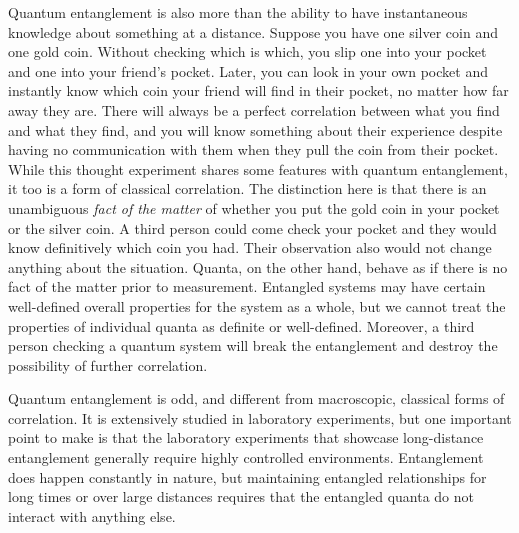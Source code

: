 \documentclass[onecolumn,preprintnumbers,amsmath,amssymbn,reprint,nofootinbib,superscriptaddress]{revtex4}    %
\begin{document}
Quantum entanglement is also more than the ability to have instantaneous knowledge about something at a distance.  Suppose you have one silver coin and one gold coin.  Without checking which is which, you slip one into your pocket and one into your friend's pocket.  Later, you can look in your own pocket and instantly know which coin your friend will find in their pocket, no matter how far away they are.  There will always be a perfect correlation between what you find and what they find, and you will  know something about their experience despite having no communication with them when they pull the coin from their pocket.  While this thought experiment shares some features with quantum entanglement, it too is a form of classical correlation.  The distinction here is that there is an unambiguous {\em fact of the matter} of whether you put the gold coin in your pocket or the silver coin. A third person could come check your pocket and they would know definitively which coin you had.  Their observation also would not change anything about the situation.  Quanta, on the other hand, behave as if there is no fact of the matter prior to measurement.  Entangled systems may have certain well-defined overall properties for the system as a whole, but we cannot treat the properties of individual quanta as definite or well-defined.  Moreover, a third person checking a quantum system will break the entanglement and destroy the possibility of further correlation.    

Quantum entanglement is odd, and different from macroscopic, classical forms of correlation.  It is extensively studied in laboratory experiments, but one important point to make is that the laboratory experiments that showcase long-distance entanglement generally require highly controlled environments.  Entanglement does happen constantly in nature, but maintaining entangled relationships for long times or over large distances requires that the entangled quanta do not interact with anything else.  
\end{document}
